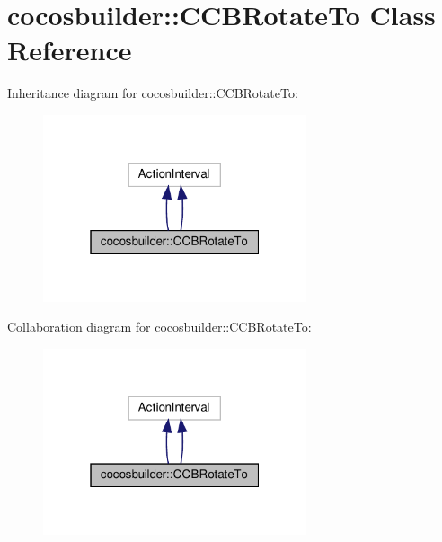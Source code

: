 \hypertarget{classcocosbuilder_1_1CCBRotateTo}{}\section{cocosbuilder\+:\+:C\+C\+B\+Rotate\+To Class Reference}
\label{classcocosbuilder_1_1CCBRotateTo}


Inheritance diagram for cocosbuilder\+:\+:C\+C\+B\+Rotate\+To\+:
\nopagebreak
\begin{figure}[H]
\begin{center}
\leavevmode
\includegraphics[width=220pt]{classcocosbuilder_1_1CCBRotateTo__inherit__graph}
\end{center}
\end{figure}


Collaboration diagram for cocosbuilder\+:\+:C\+C\+B\+Rotate\+To\+:
\nopagebreak
\begin{figure}[H]
\begin{center}
\leavevmode
\includegraphics[width=220pt]{classcocosbuilder_1_1CCBRotateTo__coll__graph}
\end{center}
\end{figure}
